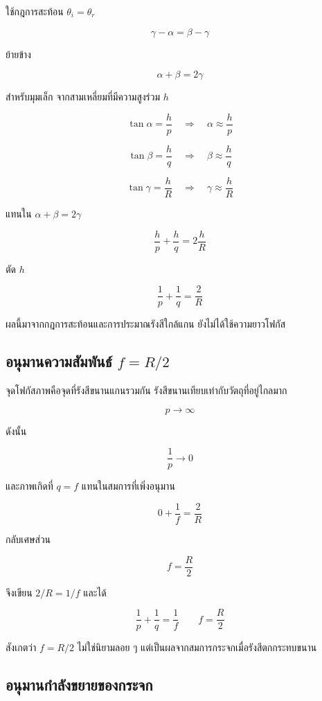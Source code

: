 ใช้กฎการสะท้อน $\theta_i=\theta_r$

\[
\gamma-\alpha=\beta-\gamma
\]

ย้ายข้าง

\[
\alpha+\beta=2\gamma
\]

สำหรับมุมเล็ก จากสามเหลี่ยมที่มีความสูงร่วม $h$

\[
\tan\alpha=\frac{h}{p}
\quad\Rightarrow\quad
\alpha\approx\frac{h}{p}
\]

\[
\tan\beta=\frac{h}{q}
\quad\Rightarrow\quad
\beta\approx\frac{h}{q}
\]

\[
\tan\gamma=\frac{h}{R}
\quad\Rightarrow\quad
\gamma\approx\frac{h}{R}
\]

แทนใน $\alpha+\beta=2\gamma$

\[
\frac{h}{p}+\frac{h}{q}=2\frac{h}{R}
\]

ตัด $h$

\[
\boxed{\frac{1}{p}+\frac{1}{q}=\frac{2}{R}}
\]

ผลนี้มาจากกฎการสะท้อนและการประมาณรังสีใกล้แกน ยังไม่ได้ใช้ความยาวโฟกัส

\subsection{อนุมานความสัมพันธ์ $f=R/2$}

จุดโฟกัสภาพคือจุดที่รังสีขนานแกนรวมกัน รังสีขนานเทียบเท่ากับวัตถุที่อยู่ไกลมาก

\[
p\to\infty
\]

ดังนั้น

\[
\frac{1}{p}\to0
\]

และภาพเกิดที่ $q=f$ แทนในสมการที่เพิ่งอนุมาน

\[
0+\frac{1}{f}=\frac{2}{R}
\]

กลับเศษส่วน

\[
\boxed{f=\frac{R}{2}}
\]

จึงเขียน $2/R=1/f$ และได้

\begin{tcolorbox}[title={สมการกระจกทรงกลม}]
\[
\boxed{\frac{1}{p}+\frac{1}{q}=\frac{1}{f}}
\qquad
\boxed{f=\frac{R}{2}}
\]
\end{tcolorbox}

สังเกตว่า $f=R/2$ ไม่ใช่นิยามลอย ๆ แต่เป็นผลจากสมการกระจกเมื่อรังสีตกกระทบขนาน

\subsection{อนุมานกำลังขยายของกระจก}

